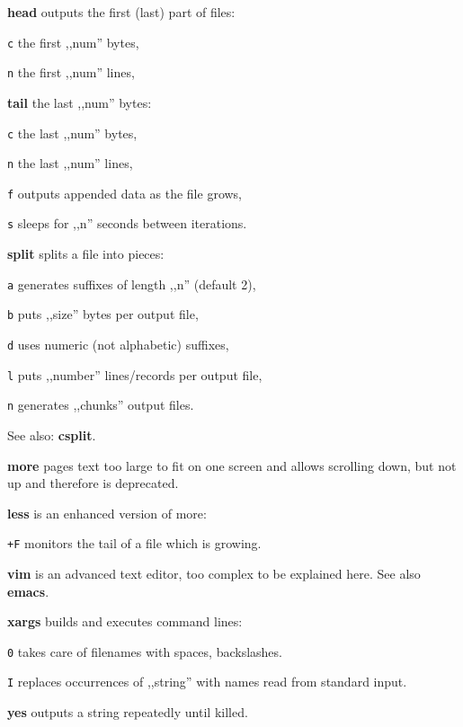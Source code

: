 \begin{enumx}
	\item [\cmdblack] \textbf{head} outputs the first (last) part of files:
	\item [\texttt{c}] the first ,,num'' bytes,
	\item [\texttt{n}] the first ,,num'' lines,
	\item [\cmdblack] \textbf{tail} the last ,,num'' bytes:
	\item [\texttt{c}] the last ,,num'' bytes,
	\item [\texttt{n}] the last ,,num'' lines,
	\item [\texttt{f}] outputs appended data as the file grows,
	\item [\texttt{s}] sleeps for ,,n'' seconds between iterations. 
	\item [\cmdblack] \textbf{split} splits a file into pieces:
	\item [\texttt{a}] generates suffixes of length ,,n'' (default 2),
	\item [\texttt{b}] puts ,,size'' bytes per output file,
	\item [\texttt{d}] uses numeric (not alphabetic) suffixes,
	\item [\texttt{l}] puts ,,number'' lines/records per output file,
	\item [\texttt{n}] generates ,,chunks'' output files.
	\item [\cmdblack] See also: \textbf{csplit}.
\end{enumx}

\begin{enumx}
	\item [\cmd] \textbf{more} pages text too large to fit on one screen and 
	allows scrolling down, but not up and therefore is deprecated.
	\item [\cmd] \textbf{less} is an enhanced version of more:
	\item [\texttt{+F}] monitors the tail of a file which is growing.
\end{enumx}

\begin{enumx}
	\item [\cmd] \textbf{vim} is an advanced text editor, 
	too complex to be explained here.
	See also \textbf{emacs}.
\end{enumx}

\begin{enumx}
	\item [\cmd] \textbf{xargs} builds and executes command lines:
	\item [\texttt{0}] takes care of filenames with spaces, backslashes.
	\item [\texttt{I}] replaces occurrences of ,,string'' with names read from standard input.
\end{enumx}

\begin{enumx}
	\item [\cmd] \textbf{yes} outputs a string repeatedly until killed.
\end{enumx}
